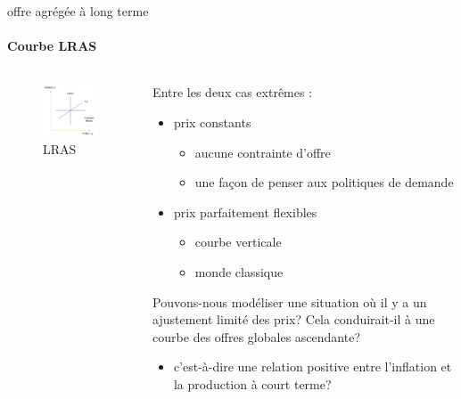 \documentclass[
  ignorenonframetext,
  aspectratio=169,
]{beamer}
\providecommand{\tightlist}{%
  \setlength{\itemsep}{0pt}\setlength{\parskip}{0pt}}\usepackage{longtable,booktabs,array}
\begin{document}
\begin{frame}{offre agrégée à long terme}
\label{offre-agruxe9guxe9e-uxe0-long-terme}
\framesubtitle{Courbe LRAS}

\begin{columns}[T]
\begin{column}{0.48\textwidth}
\begin{figure}[H]

{\centering \includegraphics{assets/as.png}

}

\caption{LRAS}

\end{figure}%
\end{column}

\begin{column}{0.48\textwidth}
Entre les deux cas extrêmes :

\begin{itemize}
\tightlist
\item
  prix constants

  \begin{itemize}
  \tightlist
  \item
    aucune contrainte d'offre
  \item
    une façon de penser aux politiques de demande
  \end{itemize}
\item
  prix parfaitement flexibles

  \begin{itemize}
  \tightlist
  \item
    courbe verticale
  \item
    monde classique
  \end{itemize}
\end{itemize}

Pouvons-nous modéliser une situation où il y a un ajustement limité des
prix? Cela conduirait-il à une courbe des offres globales ascendante?

\begin{itemize}
\tightlist
\item
  c'est-à-dire une relation positive entre l'inflation et la production
  à court terme?
\end{itemize}
\end{column}
\end{columns}
\end{frame}
\end{document}
